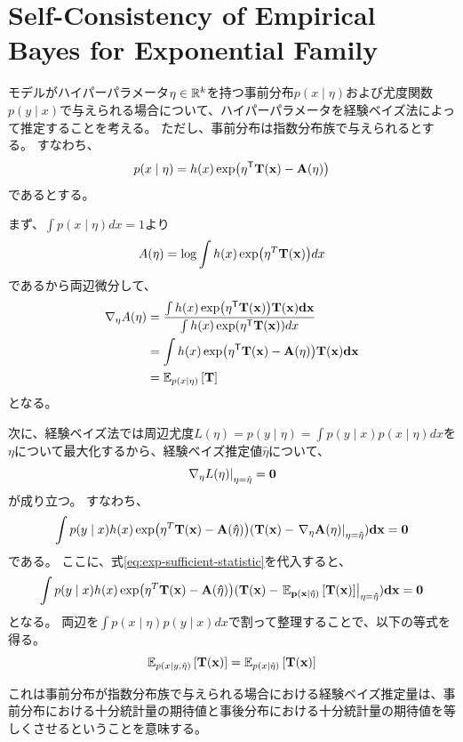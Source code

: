 \documentclass[../main.tex]{subfiles}
\begin{document}
\section{Self-Consistency of Empirical Bayes for Exponential Family}

モデルがハイパーパラメータ\(\eta \in \mathbb{R}^k\)を持つ事前分布\(p(x \mid \eta)\)および尤度関数\(p(y \mid x)\)で与えられる場合について、ハイパーパラメータを経験ベイズ法によって推定することを考える。
ただし、事前分布は指数分布族で与えられるとする。
すなわち、
\begin{equation}
  p(x \mid \eta) = h(x) \exp(\eta^{\mathsf{T}} \bf{T}(x) - A(\eta))
\end{equation}
であるとする。

まず、\(\int p(x \mid \eta) dx = 1\)より
\begin{equation}
  A(\eta) = \log \int h(x) \exp(\eta^T \bf{T}(x)) dx
\end{equation}
であるから両辺微分して、
\begin{align}
  \nabla_\eta A(\eta) &= \frac{\int h(x)\exp(\eta^{\mathsf{T}} \bf{T}(x)) \bf{T}(x)dx}{\int h(x)\exp(\eta^{\mathsf{T}} \bf{T}(x))dx} \\
  &= \int h(x)\exp(\eta^{\mathsf{T}} \bf{T}(x) - A(\eta)) \bf{T}(x)dx \\
  &= \mathbb{E}_{p(x\mid \eta)} \left[ \bf{T} \right]  \label{eq:exp-sufficient-statistic}
\end{align}
となる。

次に、経験ベイズ法では周辺尤度\(L(\eta) = p(y \mid \eta) = \int p(y \mid x) p(x \mid \eta) dx\)を\(\eta\)について最大化するから、経験ベイズ推定値\(\hat{\eta}\)について、
\begin{equation}
  \left.\nabla_\eta L(\eta)\right|_{\eta=\hat{\eta}} = \bf{0}
\end{equation}
が成り立つ。
すなわち、
\begin{equation}
  \int p(y\mid x) h(x) \exp(\eta^T \bf{T}(x) - A(\hat{\eta})) (\bf{T}(x) - \left.\nabla_\eta A(\eta)\right|_{\eta=\hat{\eta}}) dx = \bf{0}
\end{equation}
である。
ここに、式\eqref{eq:exp-sufficient-statistic}を代入すると、
\begin{equation}
  \int p(y\mid x) h(x) \exp(\eta^T \bf{T}(x) - A(\hat{\eta})) (\bf{T}(x) - \left.\mathbb{E}_{p(x\mid \hat{\eta})} \left[\bf{T}(x)\right]\right|_{\eta=\hat{\eta}}) dx = \bf{0}
\end{equation}
となる。
両辺を\(\int p(x \mid \eta) p(y \mid x) dx\)で割って整理することで、以下の等式を得る。
\begin{equation}
  \mathbb{E}_{p(x \mid y, \hat{\eta})} \left[ \bf{T}(x) \right] = \mathbb{E}_{p(x \mid \hat{\eta})} \left[ \bf{T}(x) \right]
\end{equation}

これは事前分布が指数分布族で与えられる場合における経験ベイズ推定量は、事前分布における十分統計量の期待値と事後分布における十分統計量の期待値を等しくさせるということを意味する。
\end{document}
